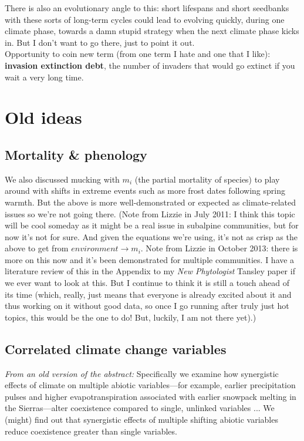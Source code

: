 \documentclass[11pt,a4paper,oneside]{article}
\begin{document}
There is also an evolutionary angle to this: short lifespans and short seedbanks with these sorts of long-term cycles could lead to evolving quickly, during one climate phase, towards a damn stupid strategy when the next climate phase kicks in. But I don't want to go there, just to point it out.\\

\noindent Opportunity to coin new term (from one term I hate and one that I like): {\bf invasion extinction debt}, the number of invaders that would go extinct if you wait a very long time. 

\newpage
\section{Old ideas}

\subsection{Mortality \& phenology}

\noindent We also discussed mucking with \(m_{i}\) (the partial
mortality of species) to play around with
shifts in extreme events such as more frost dates following spring
warmth. But the above is more well-demonstrated or expected as
climate-related issues so we're not going there. (Note from Lizzie in
July 2011: I think this topic will be cool someday as it might be a
real issue in subalpine communities, but for now it's not for
sure. And given the equations we're using, it's not as crisp as the
above to get from \(environment\rightarrow m_{i}\). Note from Lizzie in October 2013: there is more on this now and it's been demonstrated for multiple communities. I have a literature review of this in the Appendix to my \emph{New Phytologist} Tansley paper if we ever want to look at this. But I continue to think it is still a touch ahead of its time (which, really, just means that everyone is already excited about it and thus working on it without good data, so once I go running after truly just hot topics, this would be the one to do! But, luckily, I am not there yet).)\\ 

\subsection{Correlated climate change variables}
\noindent \emph{From an old version of the abstract:} Specifically we examine how
synergistic effects of climate on multiple abiotic variables---for
example, earlier precipitation pulses and higher evapotranspiration
associated with earlier snowpack melting in the Sierras---alter
coexistence compared to single, unlinked variables ... We
  (might) find out that synergistic effects of multiple shifting
  abiotic variables reduce coexistence greater than single
  variables. \\
\end{document}
